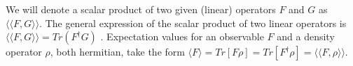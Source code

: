 {%
%
%
%
%
%
%
%
%
%
%
%




We will denote a scalar product of two given (linear) operators $F$ and $G$ as $ \langle\langle F,G \rangle\rangle$. The general expression of the scalar product of two linear operators is $\langle\langle F,G \rangle\rangle=Tr(F^{\dagger}G)$ \cite{Simon2018}. Expectation values for an observable $F$ and a density operator $\rho$, both hermitian, take the form $\langle F\rangle=Tr[F\rho]=Tr[F^{\dagger}\rho]=\langle\langle F,\rho \rangle\rangle$.

}
